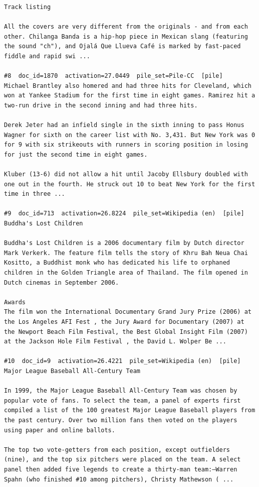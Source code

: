 \begin{verbatim}
Track listing

All the covers are very different from the originals - and from each other. Chilanga Banda is a hip-hop piece in Mexican slang (featuring the sound "ch"), and Ojalá Que Llueva Café is marked by fast-paced fiddle and rapid swi ...

#8  doc_id=1870  activation=27.0449  pile_set=Pile-CC  [pile]
Michael Brantley also homered and had three hits for Cleveland, which won at Yankee Stadium for the first time in eight games. Ramirez hit a two-run drive in the second inning and had three hits.

Derek Jeter had an infield single in the sixth inning to pass Honus Wagner for sixth on the career list with No. 3,431. But New York was 0 for 9 with six strikeouts with runners in scoring position in losing for just the second time in eight games.

Kluber (13-6) did not allow a hit until Jacoby Ellsbury doubled with one out in the fourth. He struck out 10 to beat New York for the first time in three ...

#9  doc_id=713  activation=26.8224  pile_set=Wikipedia (en)  [pile]
Buddha's Lost Children

Buddha's Lost Children is a 2006 documentary film by Dutch director Mark Verkerk. The feature film tells the story of Khru Bah Neua Chai Kositto, a Buddhist monk who has dedicated his life to orphaned children in the Golden Triangle area of Thailand. The film opened in Dutch cinemas in September 2006.

Awards
The film won the International Documentary Grand Jury Prize (2006) at the Los Angeles AFI Fest , the Jury Award for Documentary (2007) at the Newport Beach Film Festival, the Best Global Insight Film (2007) at the Jackson Hole Film Festival , the David L. Wolper Be ...

#10  doc_id=9  activation=26.4221  pile_set=Wikipedia (en)  [pile]
Major League Baseball All-Century Team

In 1999, the Major League Baseball All-Century Team was chosen by popular vote of fans. To select the team, a panel of experts first compiled a list of the 100 greatest Major League Baseball players from the past century. Over two million fans then voted on the players using paper and online ballots.

The top two vote-getters from each position, except outfielders (nine), and the top six pitchers were placed on the team. A select panel then added five legends to create a thirty-man team:—Warren Spahn (who finished #10 among pitchers), Christy Mathewson ( ...

\end{verbatim}

